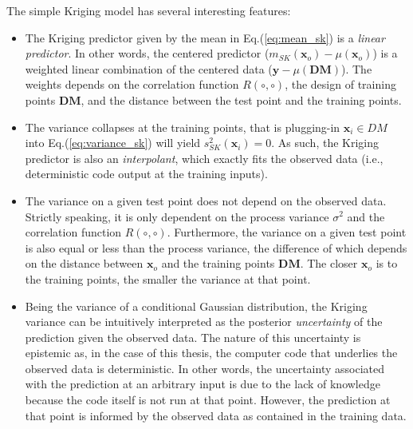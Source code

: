 The simple Kriging model has several interesting features:
\begin{itemize}
	\item The Kriging predictor given by the mean in Eq.(\ref{eq:mean_sk}) is a \emph{linear predictor}. 
	      In other words, the centered predictor ($m_{SK}(\mathbf{x}_o) - \mu (\mathbf{x}_o)$)  is a weighted linear combination of the centered data 
	      ($\mathbf{y} - \mu(\mathbf{DM})$).
				The weights depends on the correlation function $R(\circ,\circ)$, the design of training points $\mathbf{DM}$, and the distance between the test point and the training points.
	\item The variance collapses at the training points, that is plugging-in $\mathbf{x}_i \in DM$ into Eq.(\ref{eq:variance_sk}) will yield $s^2_{SK}(\mathbf{x}_i) = 0$.
	      As such, the Kriging predictor is also an \emph{interpolant}, which exactly fits the observed data (i.e., deterministic code output at the training inputs).
	\item The variance on a given test point does not depend on the observed data.
	      Strictly speaking, it is only dependent on the process variance $\sigma^2$ and the correlation function $R(\circ,\circ)$.
				Furthermore, the variance on a given test point is also equal or less than the process variance, 
				the difference of which depends on the distance between $\mathbf{x}_o$ and the training points $\mathbf{DM}$.
				The closer $\mathbf{x}_o$ is to the training points, the smaller the variance at that point.
	\item Being the variance of a conditional Gaussian distribution, the Kriging variance can be intuitively interpreted as the posterior \emph{uncertainty} of the prediction given the observed data.
	      The nature of this uncertainty is epistemic as, in the case of this thesis, the computer code that underlies the observed data is deterministic.
				In other words, the uncertainty associated with the prediction at an arbitrary input is due to the lack of knowledge because the code itself is not run at that point.
				However, the prediction at that point is informed by the observed data as contained in the training data.
\end{itemize}

